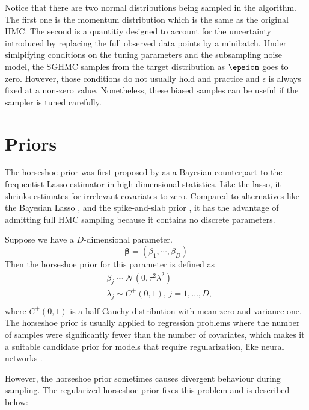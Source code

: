 \documentclass[12pt]{report}
\begin{document}
Notice that there are two normal distributions being sampled in the algorithm. The first one is the momentum distribution which is the same as the original HMC. The second is a quantitiy designed to account for the uncertainty introduced by replacing the full observed data points by a minibatch. Under simlpifying conditions on the tuning parameters and the subsampling noise model, the SGHMC samples from the target distribution as $\epsion$ goes to zero. However, those conditions do not usually hold and practice and $\epsilon$ is always fixed at a non-zero value. Nonetheless, these biased samples can be useful if the sampler is tuned carefully.


\section{Priors}

The horseshoe prior was first proposed by \cite{carvalho2009handling} as a Bayesian counterpart to the frequentist Lasso estimator in high-dimensional statistics. Like the lasso, it shrinks estimates for irrelevant covariates to zero. Compared to alternatives like the Bayesian Lasso \cite{park2008bayesian}, and the spike-and-slab prior \cite{mitchell1988bayesian}, it has the advantage of admitting full HMC sampling because it contains no discrete parameters.

Suppose we have a $D$-dimensional parameter.
\[ \mathbf{\beta} = (\beta_1,\cdots,\beta_D)\]
Then the horseshoe prior for this parameter is defined as
\begin{align*}
 &\beta_j \sim \mathcal{N}(0,\tau^2\lambda^2) \\
 &\lambda_j \sim C^+(0,1),\, j = 1,\dots , D, \\
\end{align*}
where $C^+(0,1)$ is a half-Cauchy distribution with mean zero and variance one. The horseshoe prior is usually applied to regression problems where the number of samples were significantly fewer than the number of covariates, which makes it a suitable candidate prior for models that require regularization, like neural networks \cite{ghosh2017model}.

However, the horseshoe prior sometimes causes divergent behaviour during sampling. The regularized horseshoe prior \cite{piironen2017sparsity} fixes this problem and is described below:
\end{document}
